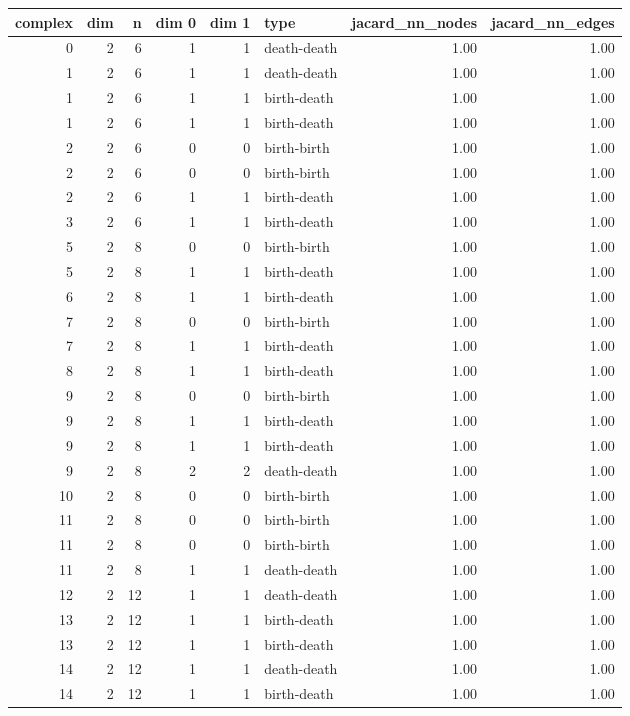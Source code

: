 \documentclass{article}
\begin{document}
\begin{center}
\begin{tabular}{rrrrrlrr}
\toprule
complex & dim & n & dim 0 & dim 1 & type & jacard\_nn\_nodes & jacard\_nn\_edges \\
\midrule
0 & 2 & 6 & 1 & 1 & death-death & 1.00 & 1.00 \\
1 & 2 & 6 & 1 & 1 & death-death & 1.00 & 1.00 \\
1 & 2 & 6 & 1 & 1 & birth-death & 1.00 & 1.00 \\
1 & 2 & 6 & 1 & 1 & birth-death & 1.00 & 1.00 \\
2 & 2 & 6 & 0 & 0 & birth-birth & 1.00 & 1.00 \\
2 & 2 & 6 & 0 & 0 & birth-birth & 1.00 & 1.00 \\
2 & 2 & 6 & 1 & 1 & birth-death & 1.00 & 1.00 \\
3 & 2 & 6 & 1 & 1 & birth-death & 1.00 & 1.00 \\
5 & 2 & 8 & 0 & 0 & birth-birth & 1.00 & 1.00 \\
5 & 2 & 8 & 1 & 1 & birth-death & 1.00 & 1.00 \\
6 & 2 & 8 & 1 & 1 & birth-death & 1.00 & 1.00 \\
7 & 2 & 8 & 0 & 0 & birth-birth & 1.00 & 1.00 \\
7 & 2 & 8 & 1 & 1 & birth-death & 1.00 & 1.00 \\
8 & 2 & 8 & 1 & 1 & birth-death & 1.00 & 1.00 \\
9 & 2 & 8 & 0 & 0 & birth-birth & 1.00 & 1.00 \\
9 & 2 & 8 & 1 & 1 & birth-death & 1.00 & 1.00 \\
9 & 2 & 8 & 1 & 1 & birth-death & 1.00 & 1.00 \\
9 & 2 & 8 & 2 & 2 & death-death & 1.00 & 1.00 \\
10 & 2 & 8 & 0 & 0 & birth-birth & 1.00 & 1.00 \\
11 & 2 & 8 & 0 & 0 & birth-birth & 1.00 & 1.00 \\
11 & 2 & 8 & 0 & 0 & birth-birth & 1.00 & 1.00 \\
11 & 2 & 8 & 1 & 1 & death-death & 1.00 & 1.00 \\
12 & 2 & 12 & 1 & 1 & death-death & 1.00 & 1.00 \\
13 & 2 & 12 & 1 & 1 & birth-death & 1.00 & 1.00 \\
13 & 2 & 12 & 1 & 1 & birth-death & 1.00 & 1.00 \\
14 & 2 & 12 & 1 & 1 & death-death & 1.00 & 1.00 \\
14 & 2 & 12 & 1 & 1 & birth-death & 1.00 & 1.00 \\

\end{tabular}
\end{center}
\end{document}
